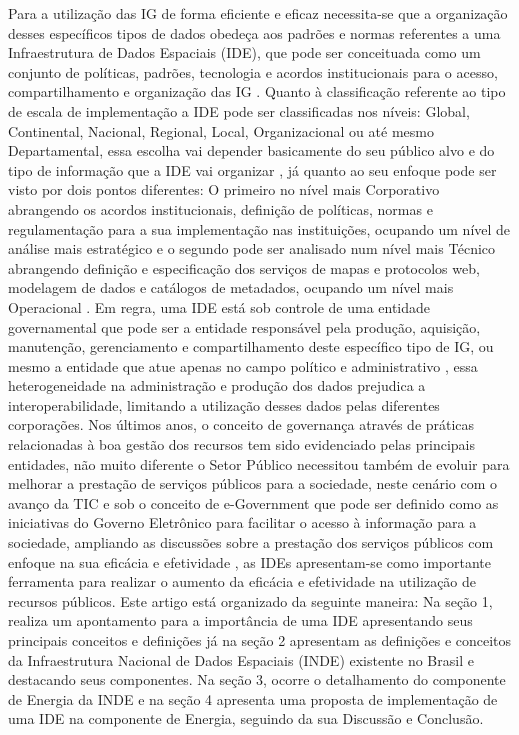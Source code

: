 \documentclass[preprint,authoryear,12pt]{elsarticle}
\begin{document}
\begin{multicols}{2}
Para a utilização das IG de forma eficiente e eficaz necessita-se que a organização desses específicos tipos de dados obedeça aos padrões e normas referentes a uma Infraestrutura de Dados Espaciais (IDE), que pode ser conceituada como um conjunto de políticas, padrões, tecnologia e acordos institucionais para o acesso, compartilhamento e organização das IG \citep{DAmore2012ICTManagement, Kobben2013TowardsInfrastructure, Stock2012ToInfrastructure}.
Quanto à classificação referente ao tipo de escala de implementação a IDE pode ser classificadas nos níveis: Global, Continental, Nacional, Regional, Local, Organizacional ou até mesmo Departamental, essa escolha vai depender basicamente do seu público alvo e do tipo de informação que a IDE vai organizar \citep{Bejar2012AnInfrastructures}, já quanto ao seu enfoque pode ser visto por dois pontos diferentes: O primeiro no nível mais Corporativo abrangendo os acordos institucionais, definição de políticas, normas e regulamentação para a sua implementação nas instituições, ocupando um nível de análise mais estratégico e o segundo pode ser analisado num nível mais Técnico abrangendo definição e especificação dos serviços de mapas e protocolos web, modelagem de dados e catálogos de metadados, ocupando um nível mais Operacional \citep{Cooper2013AViewpoint}. 
Em regra, uma IDE está sob controle de uma entidade governamental que pode ser a entidade responsável pela produção, aquisição, manutenção, gerenciamento e compartilhamento deste específico tipo de IG, ou mesmo a entidade que atue apenas no campo político e administrativo \citep{Grus2011AnGoals}, essa heterogeneidade na administração e produção dos dados prejudica a interoperabilidade, limitando a utilização desses dados pelas diferentes corporações. Nos últimos anos, o conceito de governança através de práticas relacionadas à boa gestão dos recursos tem sido evidenciado pelas principais entidades, não muito diferente o Setor Público necessitou também de evoluir para melhorar a prestação de serviços públicos para a sociedade, neste cenário com o avanço da TIC e sob o conceito de e-Government que pode ser definido como as iniciativas do Governo Eletrônico para facilitar o acesso à informação para a sociedade, ampliando as discussões sobre a prestação dos serviços públicos com enfoque na sua eficácia e efetividade \citep{Borzacchiello2013EstimatingE-Cadastres}, as IDEs apresentam-se como importante ferramenta para realizar o aumento da eficácia e efetividade na utilização de recursos públicos.
Este artigo está organizado da seguinte maneira: Na seção 1, realiza um apontamento para a importância de uma IDE apresentando seus principais conceitos e definições já na seção 2 apresentam as definições e conceitos da Infraestrutura Nacional de Dados Espaciais (INDE) existente no Brasil e destacando seus componentes. Na seção 3, ocorre o detalhamento do componente de Energia da INDE e na seção 4 apresenta uma proposta de implementação de uma IDE na componente de Energia, seguindo da sua Discussão e Conclusão.
\end{multicols}
\end{document}
